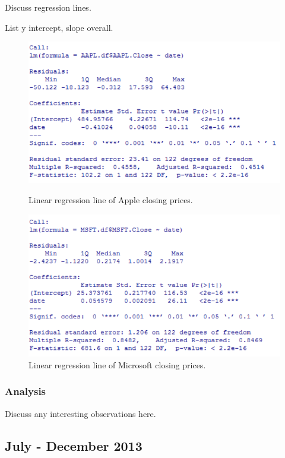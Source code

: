 \documentclass[paper=a4, fontsize=11pt]{scrartcl} %
\numberwithin{equation}{section} %
\numberwithin{figure}{section} %
\numberwithin{table}{section} %
\begin{document}
Discuss regression lines. 

List y intercept, slope overall. 

\begin{figure}[!htb]
  \includegraphics[width=\linewidth]{graph/aapl_reg_5.png}
  \caption{Linear regression line of Apple closing prices.}
\endminipage\hfill
{}
  \includegraphics[width=\linewidth]{graph/msft_reg_5.png}
  \caption{Linear regression line of Microsoft closing prices.}
\endminipage\hfill
\end{figure}


\subsubsection{Analysis}
Discuss any interesting observations here.

\subsection{July - December  2013 }
\end{document}
